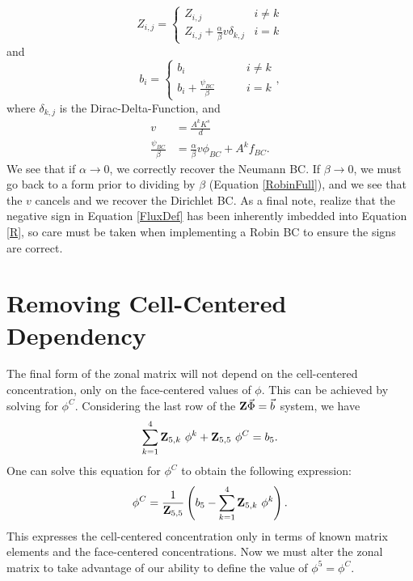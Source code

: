 \documentclass[11pt,letterpaper,oneside,notitlepage]{article}	%
\newcommand{\eq}[1]{Equation \eqref{#1}}		%
\newcommand{\pindent}[1]{\hspace{6mm}}  		%
\numberwithin{equation}{section}				%
\begin{document}
\begin{equation}
Z_{i,j} = \begin{cases}
Z_{i,j} & i\neq k\\
Z_{i,j} + \frac{\alpha}{\beta}v\delta_{k,j} & i=k
\end{cases}
\end{equation}
and
\begin{equation}
b_i = \begin{cases}
b_i &\qquad i\neq k\\
b_i + \frac{\psi_{BC}}{\beta}&\qquad i=k
\end{cases}
,\end{equation}
where $\delta_{k,j}$ is the Dirac-Delta-Function, and 
\begin{align*}
v&=\frac{A^k K^{s}}{d} \\
\frac{\psi_{BC}}{\beta} &=  \frac{\alpha}{\beta} v \phi_{BC} + A^k f_{BC}
.\end{align*}
We see that if $\alpha \to 0$, we correctly recover the Neumann BC. If $\beta\to 0$, we must go back to a form prior to dividing by $\beta$ (\eq{RobinFull}), and we see that the $v$ cancels and we recover the Dirichlet BC.
As a final note, realize that the negative sign in \eq{FluxDef} has been inherently imbedded into \eq{R}, so care must be taken when implementing a Robin BC to ensure the signs are correct.

\section{Removing Cell-Centered Dependency}%
\pindent{}The final form of the zonal matrix will not depend on the cell-centered concentration, only on the face-centered values of $\phi$.  This can be achieved by solving for $\phi^C$.  Considering the last row of the ${\bf Z}\vec\Phi=\vec b$ system, we have
\begin{equation*}
\sum_{k=1}^4 {\bf Z}_{5,k}\ \phi^k + {\bf Z}_{5,5}\ \phi^C = b_5
.\end{equation*}
One can solve this equation for $\phi^C$ to obtain the following expression:
\begin{equation}
\phi^C = \frac{1}{{\bf Z}_{5,5}} \left( b_5 - \sum_{k=1}^4 {\bf Z}_{5,k}\ \phi^k \right)
\label{PhiCsolved}.\end{equation}
This expresses the cell-centered concentration only in terms of known matrix elements and the face-centered concentrations. Now we must alter the zonal matrix to take advantage of our ability to define the value of $\phi^5=\phi^C$.  
\end{document}
